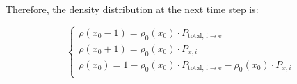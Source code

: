 	Therefore, the density distribution at the next time step is:
	
	\[   \left\{
	\begin{array}{l}
	      \rho(x_0 - 1) =   \rho_0(x_0) \cdot P_{\textrm{total},\, \textrm{i} \rightarrow \textrm{e}} \\
	      \rho(x_0 + 1) =   \rho_0(x_0) \cdot P_{x,i} \\
	      \rho(x_0) =   1 - \rho_0(x_0) \cdot P_{\textrm{total},\, \textrm{i} \rightarrow \textrm{e}} -  \rho_0(x_0) \cdot P_{x,i}\\
	\end{array} 
	\right. \]	
	
	
	
	
